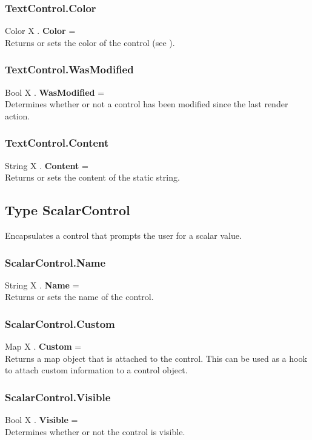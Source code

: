 \subsubsection{TextControl.Color \label{F:TextControl:Color}}
Color X . \textbf{Color} = \\
Returns or sets the color of the control (see ).

\subsubsection{TextControl.WasModified \label{F:TextControl:WasModified}}
Bool X . \textbf{WasModified} = \\
Determines whether or not a control has been modified since the last render action.

\subsubsection{TextControl.Content \label{F:TextControl:Content}}
String X . \textbf{Content} = \\
Returns or sets the content of the static string.

\subsection{Type ScalarControl \label{T:ScalarControl}}
Encapsulates a control that prompts the user for a scalar value.

\subsubsection{ScalarControl.Name \label{F:ScalarControl:Name}}
String X . \textbf{Name} = \\
Returns or sets the name of the control.

\subsubsection{ScalarControl.Custom \label{F:ScalarControl:Custom}}
Map X . \textbf{Custom} = \\
Returns a map object that is attached to the control. This can be used as a hook to attach custom information to a control object.

\subsubsection{ScalarControl.Visible \label{F:ScalarControl:Visible}}
Bool X . \textbf{Visible} = \\
Determines whether or not the control is visible.

